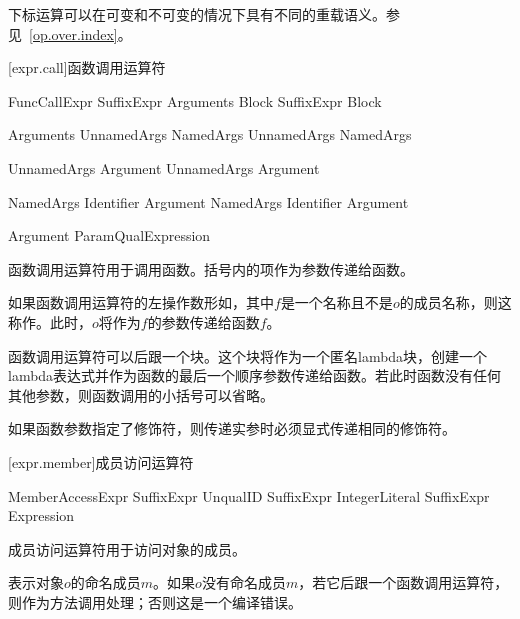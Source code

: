 \pnum
下标运算可以在可变和不可变的情况下具有不同的重载语义。参见~\ref{op.over.index}。

[expr.call]{函数调用运算符}

\begin{bnf}{FuncCallExpr}
    SuffixExpr \terminal{(} Arguments\bnfq \terminal{)} Block\bnfs \br
    SuffixExpr Block
\end{bnf}

\begin{bnf}{Arguments}
    UnnamedArgs \br
    NamedArgs \br
    UnnamedArgs \terminal{,} NamedArgs
\end{bnf}

\begin{bnf}{UnnamedArgs}
    Argument \br
    UnnamedArgs \terminal{,} Argument
\end{bnf}

\begin{bnf}{NamedArgs}
    Identifier \terminal{:} Argument \br
    NamedArgs \terminal{,} Identifier \terminal{:} Argument
\end{bnf}

\begin{bnf}{Argument}
    ParamQual\bnfq Expression
\end{bnf}

\pnum
函数调用运算符用于调用函数。括号内的项作为参数传递给函数。

\pnum
如果函数调用运算符的左操作数形如，其中$f$是一个名称且不是$o$的成员名称，则这称作。此时，$o$将作为$f$的参数传递给函数$f$。

\pnum
函数调用运算符可以后跟一个块。这个块将作为一个匿名lambda块，创建一个lambda表达式并作为函数的最后一个顺序参数传递给函数。若此时函数没有任何其他参数，则函数调用的小括号可以省略。

\pnum
如果函数参数指定了修饰符，则传递实参时必须显式传递相同的修饰符。

[expr.member]{成员访问运算符}

\begin{bnf}{MemberAccessExpr}
    SuffixExpr  UnqualID \br
    SuffixExpr  IntegerLiteral \br
    SuffixExpr  \terminal{(} Expression \terminal{)}
\end{bnf}

\pnum
成员访问运算符用于访问对象的成员。

\pnum
{}表示对象$o$的命名成员$m$。如果$o$没有命名成员$m$，若它后跟一个函数调用运算符，则作为方法调用处理；否则这是一个编译错误。

